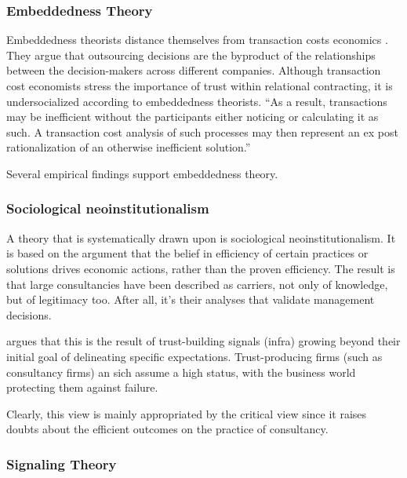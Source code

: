\documentclass[12pt]{article}
\begin{document}
\hypertarget{embeddedness-theory}{%
\subsubsection{Embeddedness Theory}\label{embeddedness-theory}}

Embeddedness theorists distance themselves from transaction costs
economics \citep[ 14-16]{armbruster2006}. They argue that outsourcing
decisions are the byproduct of the relationships between the
decision-makers across different companies. Although transaction cost
economists stress the importance of trust within relational contracting,
it is undersocialized according to embeddedness theorists. ``As a
result, transactions may be inefficient without the participants either
noticing or calculating it as such. A transaction cost analysis of such
processes may then represent an ex post rationalization of an otherwise
inefficient solution.'' \citep[ 15]{armbruster2006}

Several empirical findings support embeddedness theory.

\hypertarget{sociological-neoinstitutionalism}{%
\subsubsection{Sociological
neoinstitutionalism}\label{sociological-neoinstitutionalism}}

A theory that is systematically drawn upon \citep[ 6-8]{armbruster2006}
is sociological neoinstitutionalism. It is based on the argument that
the belief in efficiency of certain practices or solutions drives
economic actions, rather than the proven efficiency. The result is that
large consultancies have been described as carriers, not only of
knowledge, but of legitimacy too. After all, it's their analyses that
validate management decisions.

\citet[20-21]{zucker1985} argues that this is the result of
trust-building signals (infra) growing beyond their initial goal of
delineating specific expectations. Trust-producing firms (such as
consultancy firms) an sich assume a high status, with the business world
protecting them against failure.

Clearly, this view is mainly appropriated by the critical view since it
raises doubts about the efficient outcomes on the practice of
consultancy.

\hypertarget{signaling-theory}{%
\subsubsection{Signaling Theory}\label{signaling-theory}}
\end{document}
